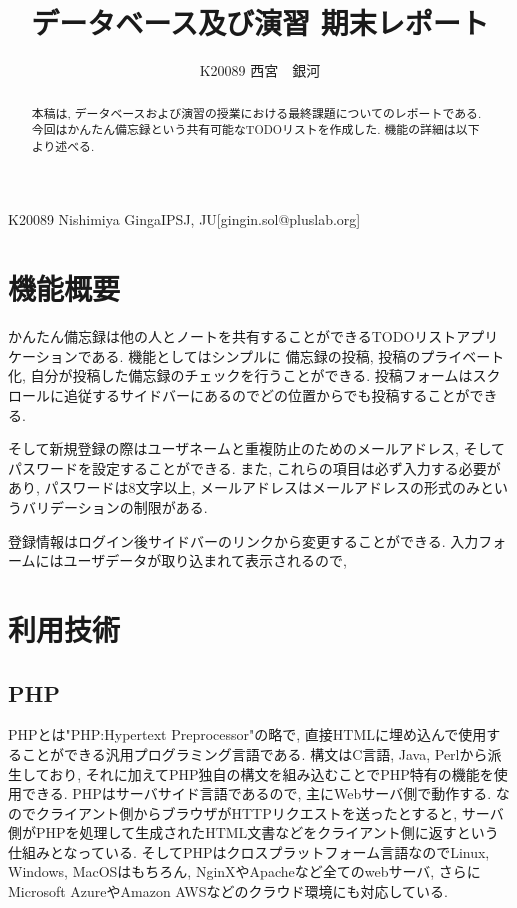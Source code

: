 \documentclass[submit,techrep]{ipsj}
\begin{document}

\title{データベース及び演習 期末レポート\\}

\author{K20089 西宮　銀河}{K20089 Nishimiya Ginga}{IPSJ, JU}[gingin.sol@pluslab.org]

\begin{abstract}
本稿は, データベースおよび演習の授業における最終課題についてのレポートである. 
今回はかんたん備忘録という共有可能なTODOリストを作成した. 機能の詳細は以下より述べる.
\end{abstract}

\maketitle

\section{機能概要}
かんたん備忘録は他の人とノートを共有することができるTODOリストアプリケーションである. 機能としてはシンプルに
備忘録の投稿, 投稿のプライベート化, 自分が投稿した備忘録のチェックを行うことができる. 投稿フォームはスクロールに追従するサイドバーにあるのでどの位置からでも投稿することができる. 

そして新規登録の際はユーザネームと重複防止のためのメールアドレス, そしてパスワードを設定することができる. 
また, これらの項目は必ず入力する必要があり, パスワードは8文字以上, メールアドレスはメールアドレスの形式のみというバリデーションの制限がある. 

登録情報はログイン後サイドバーのリンクから変更することができる. 入力フォームにはユーザデータが取り込まれて表示されるので, 


\section{利用技術}

\subsection{PHP}
PHPとは"PHP:Hypertext Preprocessor"の略で, 直接HTMLに埋め込んで使用することができる汎用プログラミング言語である. 
構文はC言語, Java, Perlから派生しており, それに加えてPHP独自の構文を組み込むことでPHP特有の機能を使用できる. 
PHPはサーバサイド言語であるので, 主にWebサーバ側で動作する. 
なのでクライアント側からブラウザがHTTPリクエストを送ったとすると, サーバ側がPHPを処理して生成されたHTML文書などをクライアント側に返すという仕組みとなっている. 
そしてPHPはクロスプラットフォーム言語なのでLinux, Windows, MacOSはもちろん, NginXやApacheなど全てのwebサーバ, さらにMicrosoft AzureやAmazon AWSなどのクラウド環境にも対応している. 
\end{document}
